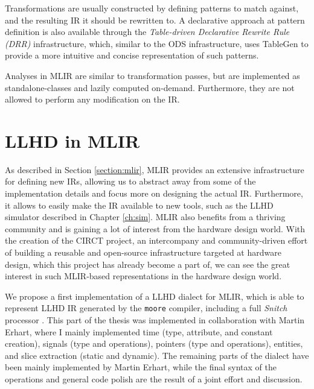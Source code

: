 Transformations are usually constructed by defining patterns to match against, and the resulting IR it should be rewritten to. A declarative approach at pattern definition is also available through the \textit{Table-driven Declarative Rewrite Rule (DRR)} infrastructure, which, similar to the ODS infrastructure, uses TableGen to provide a more intuitive and concise representation of such patterns.

Analyses in MLIR are similar to transformation passes, but are implemented as standalone-classes and lazily computed on-demand. Furthermore, they are not allowed to perform any modification on the IR.


\section{LLHD in MLIR}
\label{section:llhdmlir}
As described in Section \ref{section:mlir}, MLIR provides an extensive infrastructure for defining new IRs, allowing us to abstract away from some of the implementation details and focus more on designing the actual IR. Furthermore, it allows to easily make the IR available to new tools, such as the LLHD simulator described in Chapter \ref{ch:sim}. MLIR also benefits from a thriving community and is gaining a lot of interest from the hardware design world. With the creation of the CIRCT project, an intercompany and community-driven effort of building a reusable and open-source infrastructure targeted at hardware design, which this project has already become a part of, we can see the great interest in such MLIR-based representations in the hardware design world.

We propose a first implementation of a LLHD dialect for MLIR, which is able to represent LLHD IR generated by the \texttt{moore} compiler, including a full \textit{Snitch} processor \cite{Zaruba2020}. This part of the thesis was implemented in collaboration with Martin Erhart, where I mainly implemented time (type, attribute, and constant creation), signals (type and operations), pointers (type and operations), entities, and slice extraction (static and dynamic). The remaining parts of the dialect have been mainly implemented by Martin Erhart, while the final syntax of the operations and general code polish are the result of a joint effort and discussion.


